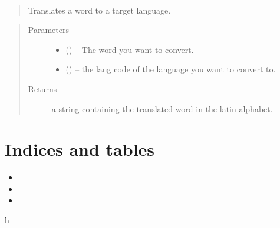 \documentclass[letterpaper,10pt,english]{sphinxmanual}
\begin{document}

\begin{fulllineitems}
\label{\detokenize{code:hp_spells.translate2}}~\begin{quote}

Translates a word to a target language.
\end{quote}
\begin{quote}\begin{description}
\item[{Parameters}] \leavevmode\begin{itemize}
\item {} 
 () -- The word you want to convert.

\item {} 
 () -- the lang code of the language you want to convert to.

\end{itemize}

\item[{Returns}] \leavevmode
a string containing the translated word in the latin alphabet.

\end{description}\end{quote}

\end{fulllineitems}



\chapter{Indices and tables}
\label{\detokenize{index:indices-and-tables}}\begin{itemize}
\item {} 

\item {} 

\item {} 

\end{itemize}


\renewcommand{\indexname}{Python Module Index}
\begin{sphinxtheindex}
\def\bigletter#1{{\Large\sffamily#1}\nopagebreak\vspace{1mm}}
\bigletter{h}
\item {}
\end{sphinxtheindex}

\renewcommand{\indexname}{Index}
\printindex
\end{document}
